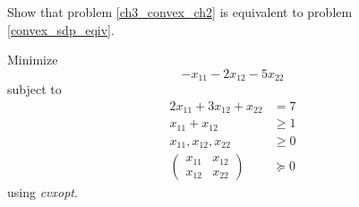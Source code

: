 \documentclass[journal,12pt,twocolumn]{IEEEtran}
\begin{document}
%
\begin{problem}
	Show that problem \ref{ch3_convex_ch2} is equivalent to problem \ref{convex_sdp_eqiv}.
\end{problem}
%
\begin{problem}
Minimize 
\begin{equation}
-x_{11} - 2x_{12} - 5x_{22}
\end{equation}
subject to
\begin{align}
\label{ch3_lin_mat_ineq_const}
2x_{11} + 3x_{12} + x_{22} &= 7 \\
x_{11} + x_{12} &\geq 1 \\
x_{11}, x_{12}, x_{22} &\geq 0 \\
\begin{pmatrix}
x_{11} & x_{12} \\
x_{12} & x_{22}
\end{pmatrix} & \succeq 0 
\end{align}
using {\em cvxopt}.
\end{problem}
\end{document}
